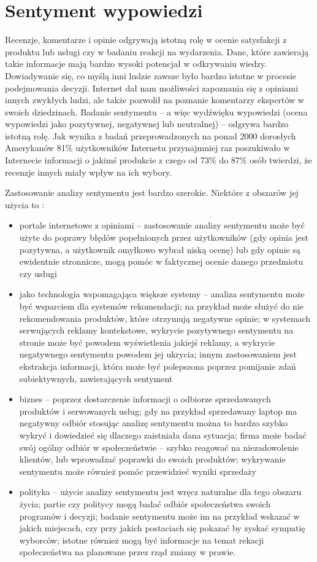 \clearpage\section{Sentyment wypowiedzi}
Recenzje, komentarze i opinie odgrywają istotną rolę w ocenie satysfakcji
z produktu lub usługi czy w badaniu reakcji na wydarzenia. Dane, które zawierają
takie informacje mają bardzo wysoki potencjał w odkrywaniu wiedzy.
Dowiadywanie się, co myślą inni ludzie zawsze było bardzo istotne w procesie
podejmowania decyzji. Internet dał nam możliwości zapoznania się z opiniami
innych zwykłych ludzi, ale także pozwolił na poznanie komentarzy 
ekspertów w swoich dziedzinach. Badanie sentymentu -- a więc wydźwięku
wypowiedzi (ocena wypowiedzi jako pozytywnej, negatywnej lub neutralnej)
-- odgrywa bardzo istotną rolę. Jak wynika z badań przeprowadzonych na ponad
2000 dorosłych Amerykanów \cite{pangLee} 81\% użytkowników Internetu
przynajmniej raz poszukiwało w Internecie informacji o jakimś produkcie
z czego od 73\% do 87\% osób twierdzi, że recenzje innych miały wpływ
na ich wybory.

Zastosowanie analizy sentymentu jest bardzo szerokie. Niektóre
z obszarów jej użycia to \cite{pangLeeApplication}:
\begin{itemize}
  \item portale internetowe z opiniami -- zastosowanie analizy sentymentu
może być użyte do poprawy błędów popełnionych przez użytkowników (gdy opinia
jest pozytywna, a użytkownik omyłkowo wybrał niską ocenę) lub gdy opinie
są ewidentnie stronnicze, mogą pomóc w faktycznej ocenie danego przedmiotu czy 
usługi
\item jako technologia wspomagająca większe systemy -- analiza sentymentu może
być wsparciem dla systemów rekomendacji; na przykład może służyć do 
nie rekomendowania produktów, które otrzymują negatywne opinie; 
w systemach serwujących reklamy kontekstowe, wykrycie pozytywnego sentymentu
na stronie może być powodem wyświetlenia jakiejś reklamy,
a wykrycie negatywnego sentymentu powodem jej ukrycia;
innym zastosowaniem jest ekstrakcja informacji, która może być
polepszona poprzez pomijanie zdań subiektywnych, zawierających sentyment
\item biznes -- poprzez dostarczenie informacji o odbiorze sprzedawanych produktów
i serwowanych usług; gdy na przykład sprzedawany laptop ma negatywny odbiór
stosując analizę sentymentu można to bardzo szybko wykryć i dowiedzieć się
dlaczego zaistniała dana sytuacja; firma może badać swój ogólny odbiór
w społeczeństwie -- szybko reagować na niezadowolenie klientów, lub wprowadzać
poprawki do swoich produktów; wykrywanie sentymentu może również pomóc
przewidzieć wyniki sprzedaży
\item polityka -- użycie analizy sentymentu jest wręcz naturalne dla tego obszaru
życia; partie czy politycy mogą badać odbiór społeczeństwa swoich programów
i decyzji; badanie sentymentu może im na przykład wskazać w jakich miejscach,
czy przy jakich postaciach się pokazać by zyskać sympatię wyborców; istotne
również mogą być informacje na temat rekacji społeczeństwa na planowane
przez rząd zmiany w prawie. 
\end{itemize}

